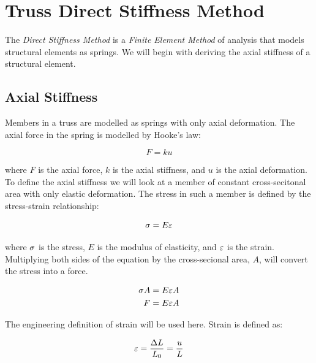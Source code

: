 \section{Truss Direct Stiffness Method}



The \textit{Direct Stiffness Method} is a \textit{Finite Element Method} of analysis that models structural elements as springs. We will begin with deriving the axial stiffness of a structural element. \cite{Felippa2000}

\subsection{Axial Stiffness}
Members in a truss are modelled as springs with only axial deformation. The axial force in the spring is modelled by Hooke's law:

\begin{equation}
	F = k u
\end{equation}

where $F$ is the axial force, $k$ is the axial stiffness, and $u$ is the axial deformation. To define the axial stiffness we will look at a member of constant cross-secitonal area with only elastic deformation. The stress in such a member is defined by the stress-strain relationship:

\begin{equation}
	\sigma = E \varepsilon
\end{equation}

where $\sigma$ is the stress, $E$ is the modulus of elasticity, and $\varepsilon$ is the strain. Multiplying both sides of the equation by the cross-secional area, $A$, will convert the stress into a force.

\begin{align}
	\sigma A &= E \varepsilon A\\
	F & = E \varepsilon A
\end{align}

The engineering definition of strain will be used here. Strain is defined as:

\begin{equation}
	\varepsilon = \frac{\Delta L}{L_0} = \frac{u}{L}
\end{equation}

